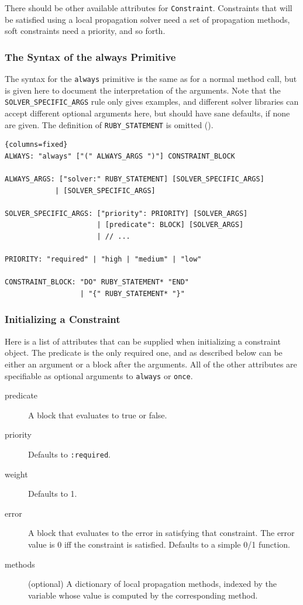 There should be other available attributes for
\lstinline{Constraint}.  Constraints that will be satisfied
using a local propagation solver need a set of propagation methods,
soft constraints need a priority, and so forth.  

\subsubsection{The Syntax of the always Primitive }
\label{sec:synt-always-prim}
The syntax for the \lstinline{always}
primitive is the same as for a normal method
call, but is given here to document the interpretation of the
arguments. Note that the \lstinline{SOLVER_SPECIFIC_ARGS} rule only
gives examples, and different solver libraries can accept different
optional arguments here, but should have sane defaults, if none are
given. The definition of \lstinline{RUBY_STATEMENT} is omitted
().
\begin{lstlisting}{columns=fixed}
ALWAYS: "always" ["(" ALWAYS_ARGS ")"] CONSTRAINT_BLOCK

ALWAYS_ARGS: ["solver:" RUBY_STATEMENT] [SOLVER_SPECIFIC_ARGS]
            | [SOLVER_SPECIFIC_ARGS]

SOLVER_SPECIFIC_ARGS: ["priority": PRIORITY] [SOLVER_ARGS]
                      | [predicate": BLOCK] [SOLVER_ARGS]
                      | // ...

PRIORITY: "required" | "high | "medium" | "low"

CONSTRAINT_BLOCK: "DO" RUBY_STATEMENT* "END"
                  | "{" RUBY_STATEMENT* "}"
\end{lstlisting}

\subsubsection{Initializing a Constraint}

Here is a list of attributes that can be supplied when initializing a
constraint object.  The predicate is the only required one, and as
described below can be either an argument or a block after the
arguments.  All of the other attributes are specifiable as optional
arguments to \lstinline{always} or \lstinline{once}.

\begin{description}
\item[predicate] A block that evaluates to true or false.  
\item[priority] Defaults to \lstinline{:required}.
\item[weight] Defaults to 1.
\item[error] A block that evaluates to the error in satisfying that
  constraint.  The error value is 0 iff the constraint is satisfied.
  Defaults to a simple 0/1 function.
\item[methods] (optional) A dictionary of local propagation methods, indexed by
  the variable whose value is computed by the corresponding
  method.
\end{description}

